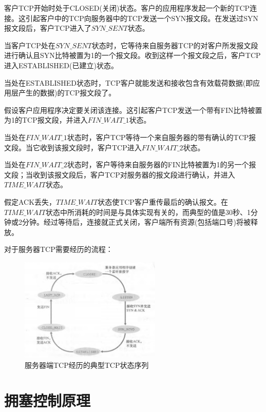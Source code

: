     

    客户TCP开始时处于CLOSED(关闭)状态。客户的应用程序发起一个新的TCP连接。这引起客户中的TCP向服务器中的TCP发送一个SYN报文段。在发送过SYN报文段后，客户TCP进入了$SYN\_SENT$状态。

    当客户TCP处在$SYN\_SENT$状态时，它等待来自服务器TCP的对客户所发报文段进行确认且SYN比特被置为1的一个报文段。收到这样一个报文段之后，客户TCP进入ESTABLISHED(已建立)状态。

    当处在ESTABLISHED状态时，TCP客户就能发送和接收包含有效载荷数据(即应用层产生的数据)的TCP报文段了。

    假设客户应用程序决定要关闭该连接。这引起客户TCP发送一个带有FIN比特被置为1的TCP报文段，并进入$FIN\_WAIT\_1$状态。

    当处在$FIN\_WAIT\_1$状态时，客户TCP等待一个来自服务器的带有确认的TCP报文段。当它收到该报文段时，客户TCP进入$FIN\_WAIT\_2$状态。

    当处在$FIN\_WAIT\_2$状态时，客户等待来自服务器的FIN比特被置为1的另一个报文段；当收到该报文段后，客户TCP对服务器的报文段进行确认，并进入$TIME\_WAIT$状态。

    假定ACK丢失，$TIME\_WAIT$状态使TCP客户重传最后的确认报文。在$TIME\_WAIT$状态中所消耗的时间是与具体实现有关的，而典型的值是30秒、1分钟或2分钟。经过等待后，连接就正式关闭，客户端所有资源(包括端口号)将被释放。

    对于服务器TCP需要经历的流程：

\begin{figure}[!htbp]
    \centering
    \includegraphics[width=0.6\textwidth]{image/chapter03/服务器TCP状态序列.png}
    \caption{服务器端TCP经历的典型TCP状态序列}
\end{figure}

\section{拥塞控制原理}

